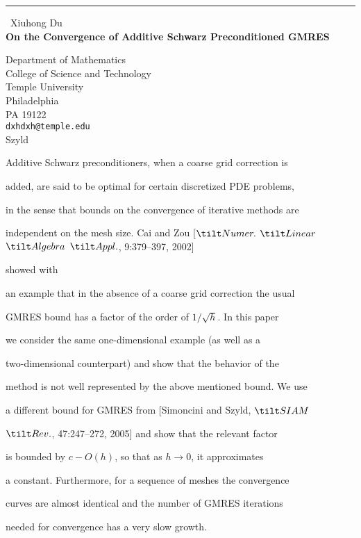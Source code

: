 \documentclass{report}
\begin{document}
\begin{center}
\rule{6in}{1pt} \
{\large Xiuhong Du \\
{\bf On the Convergence of Additive Schwarz Preconditioned GMRES}}

Department of Mathematics \\ College of Science and Technology \\ Temple University \\ Philadelphia \\ PA 19122
\\
{\tt dxhdxh@temple.edu}\\
	Szyld\end{center}



Additive Schwarz preconditioners, when a coarse grid correction is

added, are said to be optimal for certain discretized PDE problems,

in the sense that bounds on the convergence of iterative methods are

independent on the mesh size. Cai and Zou [$\tilt Numer.$
$\tilt Linear$ $\tilt Algebra$ $\tilt Appl.$, 9:379--397, 2002]

showed with

an example that in the absence of a coarse grid correction the usual

GMRES bound has a factor of the order of $1/\sqrt h$. In this paper

we consider the same one-dimensional example (as well as a

two-dimensional counterpart) and show that the behavior of the

method is not well represented by the above mentioned bound. We use

a different bound for GMRES from [Simoncini and Szyld,
$\tilt SIAM$

$\tilt Rev.$, 47:247--272, 2005] and show that the relevant factor

is bounded by $c-O(h)$, so that as $h\rightarrow 0$, it approximates

a constant. Furthermore, for a sequence of meshes the convergence

curves are almost identical and the number of GMRES iterations

needed for convergence has a very slow growth.
\end{document}
